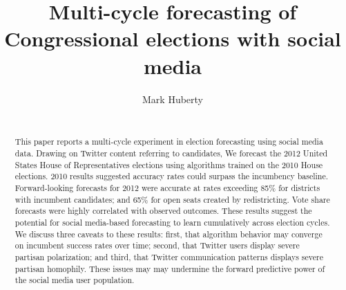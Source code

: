 \documentclass{acm_proc_article-sp}
\begin{document}
\title{Multi-cycle forecasting of Congressional elections with social
  media}
\author{\alignauthor
Mark Huberty\\
\\
}

\maketitle
\begin{abstract}
  This paper reports a multi-cycle experiment in election forecasting using social media data. Drawing on Twitter content referring to candidates, We forecast the 2012 United States House of Representatives elections using algorithms trained on the 2010 House elections. 2010 results suggested accuracy rates could surpass the incumbency baseline. Forward-looking forecasts for 2012 were accurate at rates exceeding 85\% for districts with incumbent candidates; and 65\% for open seats created by redistricting. Vote share forecasts were highly correlated with observed outcomes. These results suggest the potential for social media-based forecasting to learn cumulatively across election cycles. We discuss three caveats to these results: first, that algorithm behavior may converge on incumbent success rates over time; second, that Twitter users display severe partisan polarization; and third, that Twitter communication patterns displays severe partisan homophily. These issues may may undermine the forward predictive power of the social media user population.
\end{abstract}
\end{document}

